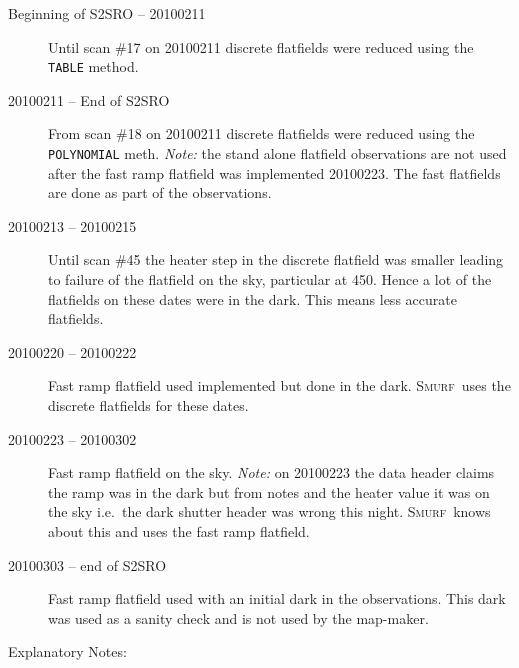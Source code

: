 \documentclass[twoside,11pt]{article}
\newcommand{\xref}[3]{#1}
\renewcommand{\_}{\texttt{\symbol{95}}}
\newcommand{\smurf}{\xref{\textsc{Smurf}}{sun258}{}}
\newcommand{\param}[1]{\texttt{#1}}
\begin{document}
\begin{description}

\item[Beginning of S2SRO -- 20100211] \mbox{}

  Until scan \#17 on 20100211 discrete flatfields were reduced using
  the \param{TABLE} method.

\item[20100211 -- End of S2SRO] \mbox{}

  From scan \#18 on 20100211 discrete flatfields were reduced using
  the \param{POLYNOMIAL} meth. \textit{Note:} the stand alone
  flatfield observations are not used after the fast ramp flatfield
  was implemented 20100223. The fast flatfields are done as part of
  the observations.

\item[20100213 -- 20100215] \mbox{}

  Until scan \#45 the heater step in the discrete flatfield was
  smaller leading to failure of the flatfield on the sky, particular
  at 450. Hence a lot of the flatfields on these dates were in the dark.
  This means less accurate flatfields.

\item[20100220 -- 20100222] \mbox{}

  Fast ramp flatfield used implemented but done in the dark. \smurf\
  uses the discrete flatfields for these dates.

\item[20100223 -- 20100302] \mbox{}

  Fast ramp flatfield on the sky.  \textit{Note:} on 20100223 the data header
  claims the ramp was in the dark but from notes and the heater value
  it was on the sky i.e.\ the dark shutter header was wrong this
  night. \smurf\ knows about this and uses the fast ramp flatfield.

\item[20100303 -- end of S2SRO] \mbox{}

  Fast ramp flatfield used with an initial dark in the
  observations. This dark was used as a sanity check and is not used
  by the map-maker.

\end{description}

Explanatory Notes:
\end{document}

